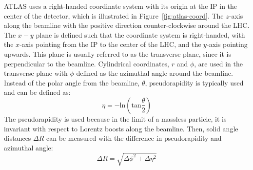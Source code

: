 ATLAS uses a right-handed coordinate system with its origin at the IP in the center of the detector, which is illustrated in Figure~\ref{fig:atlas-coord}. The $z$-axis along the beamline with the positive direction counter-clockwise around the LHC. The $x-y$ plane is defined such that the coordinate system is right-handed, with the $x$-axis pointing from the IP to the center of the LHC, and the $y$-axis pointing upwards. This plane is usually referred to as the transverse plane, since it is perpendicular to the beamline. Cylindrical coordinates, $r$ and $\phi$, are used in the transverse plane with $\phi$ defined as the azimuthal angle around the beamline. Instead of the polar angle from the beamline, $\theta$, pseudorapidity is typically used and can be defined as:
\begin{equation}
\eta = -\text{ln}(\text{tan}\frac{\theta}{2})
\label{eq:eta}
\end{equation}
The pseudorapidity is used because in the limit of a massless particle, it is invariant with respect to Lorentz boosts along the beamline. Then, solid angle distances $\Delta R$ can be measured with the difference in pseudorapidity and azimuthal angle:
\begin{equation}
\Delta R = \sqrt{\Delta \phi^2 + \Delta \eta^2}
\label{eq:dR}
\end{equation}




